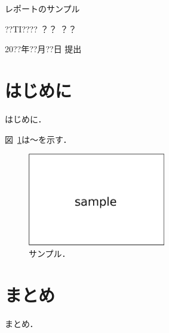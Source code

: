 \documentclass[10pt,a4paper,fleqn,dvipdfmx]{jsarticle}
\begin{document}
\begin{center}

{\Large レポートのサンプル}

\vspace{2mm}
??TI???? ？？ ？？

\vspace{2mm}
20??年??月??日 提出
\end{center}


\section{はじめに}

はじめに．

図~\ref{fig_sample}は〜を示す．

\begin{figure}[b]
\begin{center}
\includegraphics[width=60mm]{sample.eps}
\caption{サンプル．}
\label{fig_sample}
\end{center}
\end{figure}


\section{まとめ}

まとめ．
\end{document}

